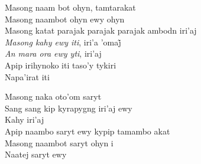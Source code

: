 \begin{linenumbers}\begingroup\raggedright
\noindent Masong naam bot ohyn, tamtarakat\\
Masong naambot ohyn ewy ohyn\\
Masong katat parajak parajak parajak ambodn iri'aj\\
\emph{Masong kahy ewy iti}, iri’a ’omaj̃\\
\emph{An mara ora ewy yti}, iri'aj\\
Apip irihynoko iti taso'y tykiri\\
Napa'irat iti

\end{linenumbers}\endgroup

\bigskip

\begin{linenumbers}\begingroup\raggedright
\noindent Masong naka oto'om saryt\\
Sang sang kip kyrapygng iri'aj ewy\\
Kahy iri'aj\\
Apip naambo saryt ewy kypip tamambo akat\\
Masong naambot saryt ohyn i\\
Naatej saryt ewy

\end{linenumbers}\endgroup

\bigskip

